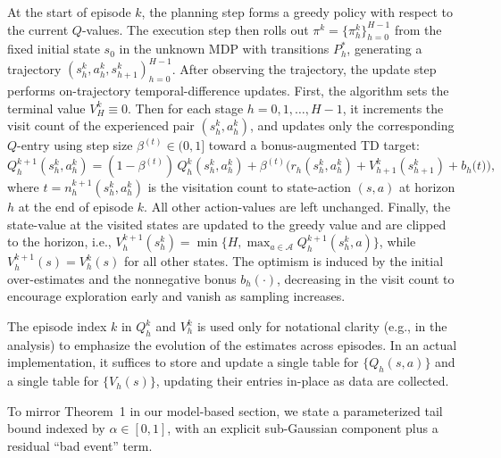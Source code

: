 \documentclass[11pt]{article}
\newcommand{\lr}{\beta}
\begin{document}
At the start of episode $k$, the planning step forms a greedy policy
with respect to the current $Q$-values. The execution step then rolls out $\pi^k=\{\pi_h^k\}_{h=0}^{H-1}$
from the fixed initial state $s_0$ in the unknown MDP with transitions
$P_h^*$, generating a trajectory $(s_h^k,a_h^k,s_{h+1}^k)_{h=0}^{H-1}$. After observing the trajectory, the update step performs on-trajectory
temporal-difference updates. First, the algorithm sets the terminal value $V_H^k\equiv 0$.
Then for each stage $h=0,1,\dots,H-1$, it increments the visit count of the
experienced pair $(s_h^k,a_h^k)$, and updates only the corresponding $Q$-entry using step size $\lr^{(t)}\in(0,1]$
toward a bonus-augmented TD target:
\[
Q_h^{k+1}(s_h^k,a_h^k)
=(1-\lr^{(t)})\,Q_h^k(s_h^k,a_h^k)
+\lr^{(t)}\Big(r_h(s_h^k,a_h^k)+V_{h+1}^k(s_{h+1}^k)
+b_h\big(t\big)\Big),
\]
where $t=n_h^{k+1}(s_h^k,a_h^k)$ is the visitation count to state-action $(s,a)$ at horizon $h$ at the end of episode $k$. All other action-values are left unchanged. Finally, the state-value at the visited states are updated to the greedy value and are clipped to the horizon, i.e., $V_h^{k+1}(s_h^k)=\min\{H, \max_{a\in\mathcal{A}} Q_h^{k+1}(s_h^k,a)\}$, while $V_h^{k+1}(s)=V_h^k(s)$ for all other states. The optimism is induced by the initial over-estimates and the nonnegative
bonus $b_h(\cdot)$, decreasing in the visit count to encourage
exploration early and vanish as sampling increases. 

The episode index $k$ in $Q_h^k$ and $V_h^k$ is used only for notational clarity (e.g., in the analysis) to emphasize the evolution of the estimates
across episodes. In an actual implementation, it suffices to store and update
a single table for $\{Q_h(s,a)\}$ and a single table for $\{V_h(s)\}$, updating
their entries in-place as data are collected.

To mirror Theorem~1 in our model-based section, we state a parameterized tail bound indexed by $\alpha\in[0,1]$, with an explicit sub-Gaussian component plus a residual ``bad event'' term.
\end{document}
